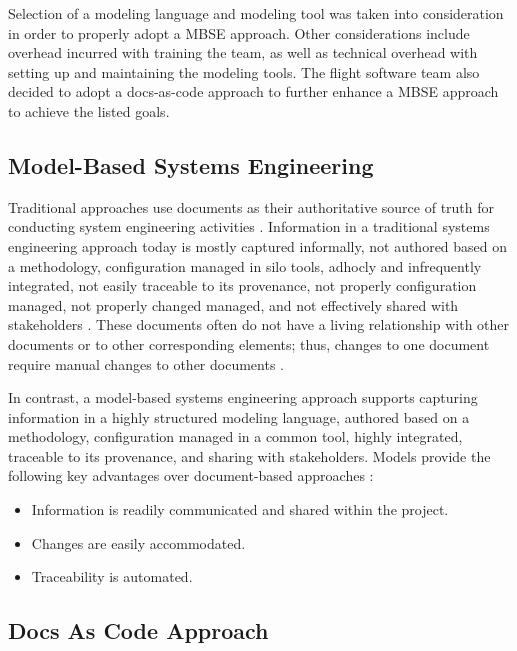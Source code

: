 \documentclass[conf]{new-aiaa}
\begin{document}
Selection of a modeling language and modeling tool was taken into consideration in order to properly adopt a MBSE approach. Other considerations include overhead incurred with training the team, as well as technical overhead with setting up and maintaining the modeling tools. The flight software team also decided to adopt a docs-as-code approach to further enhance a MBSE approach to achieve the listed goals.

\subsection{Model-Based Systems Engineering}

Traditional approaches use documents as their authoritative source of truth for conducting system engineering activities \cite{architecting_spacecraft}. Information in a traditional systems engineering approach today is mostly captured informally, not authored based on a methodology, configuration managed in silo tools, adhocly and infrequently integrated, not easily traceable to its provenance, not properly configuration managed, not properly changed managed, and not effectively shared with stakeholders \cite{caesar_model_based_approach}. These documents often do not have a living relationship with other documents or to other corresponding elements; thus, changes to one document require manual changes to other documents \cite{ibm_mbse}.

In contrast, a model-based systems engineering approach supports capturing information in a highly structured modeling language, authored based on a methodology, configuration managed in a common tool, highly integrated, traceable to its provenance, and sharing with stakeholders. Models provide the following key advantages over document-based approaches \cite{ibm_mbse}:

\begin{itemize}
    \item Information is readily communicated and shared within the project.
    
    \item Changes are easily accommodated.
    
    \item Traceability is automated.
\end{itemize}

\subsection{Docs As Code Approach}
\end{document}
